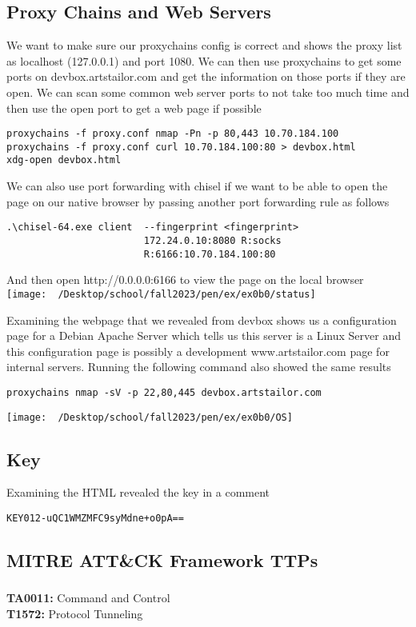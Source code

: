 \documentclass[notitlepage]{article}
\begin{document}
    \subsection{Proxy Chains and Web Servers}
    We want to make sure our proxychains config is correct and shows the proxy list as localhost (127.0.0.1) and port 1080. We can then use proxychains to get some ports on
    devbox.artstailor.com and get the information on those ports if they are open. We can scan some common web server ports to not take too much time and then use the open port to get 
    a web page if possible

    \begin{verbatim}
proxychains -f proxy.conf nmap -Pn -p 80,443 10.70.184.100
proxychains -f proxy.conf curl 10.70.184.100:80 > devbox.html
xdg-open devbox.html
    \end{verbatim}
    We can also use port forwarding with chisel if we want to be able to open the page on our native browser
    by passing another port forwarding rule as follows
    \begin{verbatim}
.\chisel-64.exe client  --fingerprint <fingerprint> 
                        172.24.0.10:8080 R:socks
                        R:6166:10.70.184.100:80
    \end{verbatim}
    And then open http://0.0.0.0:6166 to view the page on the local browser \\
\texttt{[image: ~/Desktop/school/fall2023/pen/ex/ex0b0/status]}

    Examining the webpage that we revealed from devbox shows us a configuration page for a Debian Apache Server which tells us this server is a Linux Server and this configuration page
    is possibly a development www.artstailor.com page for internal servers. Running the following command also showed the same results

    \begin{verbatim}
proxychains nmap -sV -p 22,80,445 devbox.artstailor.com
    \end{verbatim}
\texttt{[image: ~/Desktop/school/fall2023/pen/ex/ex0b0/OS]}

    \subsection{Key}
    Examining the HTML revealed the key in a comment
    \begin{verbatim}
KEY012-uQC1WMZMFC9syMdne+o0pA==
    \end{verbatim}

    \subsection{MITRE ATT{\&}CK Framework TTPs}    
    \subsubsection*{}
    \indent\textbf{TA0011:} Command and Control \\
    \indent\indent\textbf{T1572:} Protocol Tunneling \\
\end{document}
